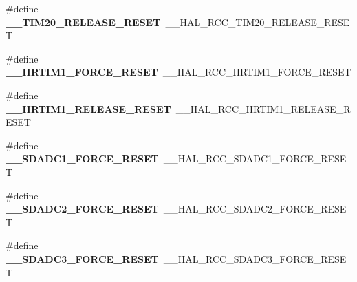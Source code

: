 \begin{DoxyCompactItemize}
\item 
\mbox{\label{group___h_a_l___r_c_c___aliased_gabc15a945f5f92e4dff05caf959715131}} 
\#define {\bfseries \+\_\+\+\_\+\+T\+I\+M20\+\_\+\+R\+E\+L\+E\+A\+S\+E\+\_\+\+R\+E\+S\+ET}~\+\_\+\+\_\+\+H\+A\+L\+\_\+\+R\+C\+C\+\_\+\+T\+I\+M20\+\_\+\+R\+E\+L\+E\+A\+S\+E\+\_\+\+R\+E\+S\+ET
\item 
\mbox{\label{group___h_a_l___r_c_c___aliased_ga0ae3e0425993ce111901795d509024d6}} 
\#define {\bfseries \+\_\+\+\_\+\+H\+R\+T\+I\+M1\+\_\+\+F\+O\+R\+C\+E\+\_\+\+R\+E\+S\+ET}~\+\_\+\+\_\+\+H\+A\+L\+\_\+\+R\+C\+C\+\_\+\+H\+R\+T\+I\+M1\+\_\+\+F\+O\+R\+C\+E\+\_\+\+R\+E\+S\+ET
\item 
\mbox{\label{group___h_a_l___r_c_c___aliased_ga94826174a601c902e37f88bcee03059a}} 
\#define {\bfseries \+\_\+\+\_\+\+H\+R\+T\+I\+M1\+\_\+\+R\+E\+L\+E\+A\+S\+E\+\_\+\+R\+E\+S\+ET}~\+\_\+\+\_\+\+H\+A\+L\+\_\+\+R\+C\+C\+\_\+\+H\+R\+T\+I\+M1\+\_\+\+R\+E\+L\+E\+A\+S\+E\+\_\+\+R\+E\+S\+ET
\item 
\mbox{\label{group___h_a_l___r_c_c___aliased_ga4772f1a0159530556eafe5771e89396b}} 
\#define {\bfseries \+\_\+\+\_\+\+S\+D\+A\+D\+C1\+\_\+\+F\+O\+R\+C\+E\+\_\+\+R\+E\+S\+ET}~\+\_\+\+\_\+\+H\+A\+L\+\_\+\+R\+C\+C\+\_\+\+S\+D\+A\+D\+C1\+\_\+\+F\+O\+R\+C\+E\+\_\+\+R\+E\+S\+ET
\item 
\mbox{\label{group___h_a_l___r_c_c___aliased_ga8ac8bc6474aee01e71d62b035fbf6126}} 
\#define {\bfseries \+\_\+\+\_\+\+S\+D\+A\+D\+C2\+\_\+\+F\+O\+R\+C\+E\+\_\+\+R\+E\+S\+ET}~\+\_\+\+\_\+\+H\+A\+L\+\_\+\+R\+C\+C\+\_\+\+S\+D\+A\+D\+C2\+\_\+\+F\+O\+R\+C\+E\+\_\+\+R\+E\+S\+ET
\item 
\mbox{\label{group___h_a_l___r_c_c___aliased_ga6a3f02c81f3fbd193d9d06e429824c68}} 
\#define {\bfseries \+\_\+\+\_\+\+S\+D\+A\+D\+C3\+\_\+\+F\+O\+R\+C\+E\+\_\+\+R\+E\+S\+ET}~\+\_\+\+\_\+\+H\+A\+L\+\_\+\+R\+C\+C\+\_\+\+S\+D\+A\+D\+C3\+\_\+\+F\+O\+R\+C\+E\+\_\+\+R\+E\+S\+ET
\item 
\mbox{\label{group___h_a_l___r_c_c___aliased_ga4c37af0e1de4a052f0a5a66a13369f49}} 

\end{DoxyCompactItemize}
